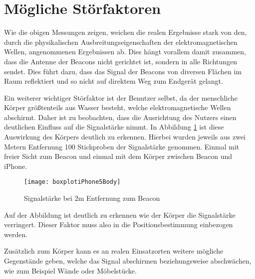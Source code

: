 \section{Mögliche Störfaktoren}
\label{sec:dataandmeasurement:interferencefactor}
Wie die obigen Messungen zeigen, weichen die realen Ergebnisse stark von den, durch die physikalischen Ausbreitungseigenschaften der elektromagnetischen Wellen, angenommenen Ergebnissen ab. Dies hängt vorallem damit zusammen, dass die Antenne der Beacons nicht gerichtet ist, sondern in alle Richtungen sendet. Dies führt dazu, dass das Signal der Beacons von diversen Flächen im Raum reflektiert und so nicht auf direktem Weg zum Endgerät gelangt. 

Ein weiterer wichtiger Störfaktor ist der Benutzer selbst, da der menschliche Körper größtenteils aus Wasser besteht, welche elektromagnetische Wellen abschirmt. Daher ist zu beobachten, dass die Ausrichtung des Nutzers einen deutlichen Einfluss auf die Signalstärke nimmt. In Abbildung \ref{boxplotiPhone5Body} ist diese Auswirkung des Körpers deutlich zu erkennen. Hierbei wurden jeweils aus zwei Metern Entfernung 100 Stichproben der Signalstärke genommen. Einmal mit freier Sicht zum Beacon und einmal mit dem Körper zwischen Beacon und iPhone. 

\begin{figure}[htb!]
		\centering
	\texttt{[image: boxplotiPhone5Body]}
	\caption{Signalstärke bei 2m Entfernung zum Beacon}
	\label{boxplotiPhone5Body}
\end{figure}

Auf der Abbildung ist deutlich zu erkennen wie der Körper die Signalstärke verringert. Dieser Faktor muss also in die Positionsbestimmung einbezogen werden.

Zusätzlich zum Körper kann es an realen Einsatzorten weitere mögliche Gegenstände geben, welche das Signal abschirmen beziehungsweise abschwächen, wie zum Beispiel Wände oder Möbelstücke.